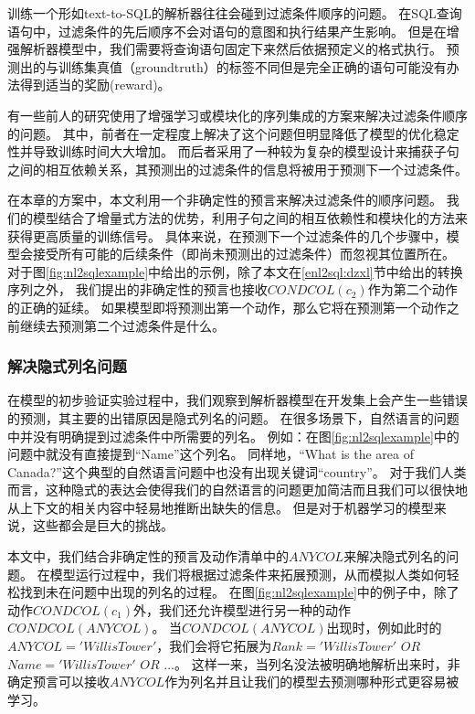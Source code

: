 训练一个形如text-to-SQL的解析器往往会碰到过滤条件顺序的问题。
在SQL查询语句中，过滤条件的先后顺序不会对语句的意图和执行结果产生影响。
但是在增强解析器模型中，我们需要将查询语句固定下来然后依据预定义的格式执行。
预测出的与训练集真值（groundtruth）的标签不同但是完全正确的语句可能没有办法得到适当的奖励(reward)。

有一些前人的研究使用了增强学习\cite{zhong2017seq2sql}或模块化的序列集成\cite{xu2017sqlnet}的方案来解决过滤条件顺序的问题。
其中，前者在一定程度上解决了这个问题但明显降低了模型的优化稳定性并导致训练时间大大增加。
而后者采用了一种较为复杂的模型设计来捕获子句之间的相互依赖关系，其预测出的过滤条件的信息将被用于预测下一个过滤条件。

在本章的方案中，本文利用一个非确定性的预言来解决过滤条件的顺序问题。
我们的模型结合了增量式方法的优势，利用子句之间的相互依赖性和模块化的方法来获得更高质量的训练信号。
具体来说，在预测下一个过滤条件的几个步骤中，模型会接受所有可能的后续条件（即尚未预测出的过滤条件）而忽视其位置所在。
对于图\ref{fig:nl2sqlexample}中给出的示例，除了本文在\ref{enl2sql:dzxl}节中给出的转换序列之外，
我们提出的非确定性的预言也接收$CONDCOL(c_2)$作为第二个动作的正确的延续。
如果模型即将预测出第一个动作，那么它将在预测第一个动作之前继续去预测第二个过滤条件是什么。
\subsubsection{解决隐式列名问题}
\label{enl2sql:icn}
在模型的初步验证实验过程中，我们观察到解析器模型在开发集上会产生一些错误的预测，其主要的出错原因是隐式列名的问题。
在很多场景下，自然语言的问题中并没有明确提到过滤条件中所需要的列名。
例如：在图\ref{fig:nl2sqlexample}中的问题中就没有直接提到“Name”这个列名。
同样地，“What is the area of Canada?”这个典型的自然语言问题中也没有出现关键词“country”。
对于我们人类而言，这种隐式的表达会使得我们的自然语言的问题更加简洁而且我们可以很快地从上下文的相关内容中轻易地推断出缺失的信息。
但是对于机器学习的模型来说，这些都会是巨大的挑战。

本文中，我们结合非确定性的预言及动作清单中的$ANYCOL$来解决隐式列名的问题。
在模型运行过程中，我们将根据过滤条件来拓展预测，从而模拟人类如何轻松找到未在问题中出现的列名的过程。
在图\ref{fig:nl2sqlexample}中的例子中，除了动作$CONDCOL(c_1)$外，我们还允许模型进行另一种的动作$CONDCOL(ANYCOL)$。
当$CONDCOL(ANYCOL)$出现时，例如此时的$ANYCOL='Willis Tower'$，我们会将它拓展为$Rank='Willis Tower'$ $OR$ $Name='Willis Tower'$ $OR$ $...$。
这样一来，当列名没法被明确地解析出来时，非确定预言可以接收$ANYCOL$作为列名并且让我们的模型去预测哪种形式更容易被学习。


